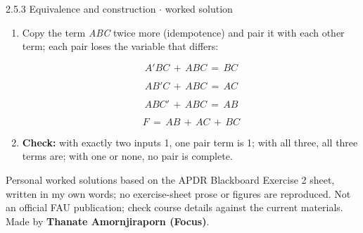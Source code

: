 \documentclass[11pt]{article}
\begin{document}
\begin{keepsection}
\begin{workedbox}{2.5.3 Equivalence and construction \ensuremath{\cdot} worked solution}
\begin{enumerate}
Write one product term for each row where \textit{F} = 1:

\begin{equation*}{F}\, =\, {A}'{B}{C}\, +\, {A}{B}'{C}\, +\, {A}{B}{C}'\, +\, {A}{B}{C}\end{equation*}
\item {}
Copy the term \textit{A}\textit{B}\textit{C} twice more (idempotence) and pair it with each other term; each pair loses the variable that differs:

\begin{equation*}{A}'{B}{C}\, +\, {A}{B}{C}\, =\, {B}{C}\end{equation*}

\begin{equation*}{A}{B}'{C}\, +\, {A}{B}{C}\, =\, {A}{C}\end{equation*}

\begin{equation*}{A}{B}{C}'\, +\, {A}{B}{C}\, =\, {A}{B}\end{equation*}

\begin{equation*}{F}\, =\, {A}{B}\, +\, {A}{C}\, +\, {B}{C}\end{equation*}
\item \textbf{Check:} with exactly two inputs 1, one pair term is 1; with all three, all three terms are; with one or none, no pair is complete.
\end{enumerate}
\end{workedbox}

\end{keepsection}

\vfill{\small Personal worked solutions based on the APDR Blackboard Exercise 2 sheet, written in my own words; no exercise-sheet prose or figures are reproduced. Not an official FAU publication; check course details against the current materials. Made by \textbf{Thanate Amornjiraporn (Focus)}.}
\end{document}

